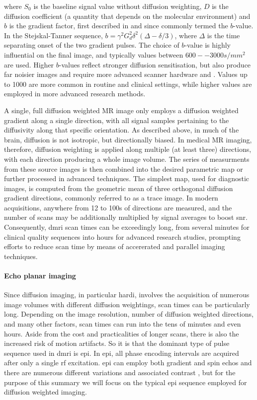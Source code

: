 where $S_0$ is the baseline signal value without diffusion weighting, $D$ is the  diffusion coefficient (a quantity that depends on the molecular environment) and $b$ is the gradient factor, first described in \autocite{LeBihan1986} and since commonly termed the $b$-value.
In the Stejskal-Tanner sequence, $b = \gamma^2 G_d^2 \delta^2 (\Delta-\delta/3)$, where $\Delta$ is the time separating onset of the two gradient pulses.
The choice of $b$-value is highly influential on the final image, and typically values between $600--3000 s/mm^2$ are used.
Higher $b$-values reflect stronger diffusion sensitisation, but also produce far noisier images and require more advanced scanner hardware and .
Values up to 1000 are more common in routine and clinical settings, while higher values are employed in more advanced research methods.

A single, full diffusion weighted MR image only employs a diffusion weighted gradient along a single direction, with all signal samples pertaining to the diffusivity along that specific orientation.
As described above, in much of the brain, diffusion is not isotropic, but directionally biased.
In medical MR imaging, therefore, diffusion weighting is applied along multiple (at least three) directions, with each direction producing a whole image volume.
The series of measurments from these source images is then combined into the desired parametric map or further processed in advanced techniques.
The simplest map, used for diagnostic images, is computed from the geometric mean of three orthogonal diffusion gradient directions, commonly referred to as a trace image.
In modern acquisitions, anywhere from 12 to 100s of directions are measured, and the number of scans may be additionally multiplied by signal averages  to boost \gls{snr}.
Consequently, \Gls{dmri} scan times can be exceedingly long, from several minutes for clinical quality sequences into hours for advanced research studies, prompting efforts to reduce scan time by means of accererated and parallel imaging techniques.

\paragraph*{Echo planar imaging}

Since diffusion imaging, in particular \gls{hardi}, involves the acquisition of numerous image volumes with different diffusion weightings, scan times can be particularly long.
Depending on the image resolution, number of diffusion weighted directions, and many other factors, scan times can run into the tens of minutes and even hours.
Aside from the cost and practicalities of longer scans, there is also the increased risk of motion artifacts.
So it is that the dominant  type of pulse sequence used in \gls{dmri} is \gls{epi}.
In \gls{epi}, all phase encoding intervals are acquired after only a single \gls{rf} excitation.
\Gls{epi} can employ both gradient and spin echos and there are numerous different variations and associated contrast , but for the purpose of this summary we will focus on the typical \gls{epi} sequence employed for diffusion weighted imaging.

